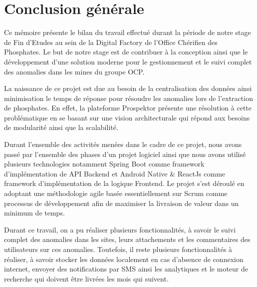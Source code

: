 \chapter*{Conclusion g\'en\'erale}

Ce m\'emoire pr\'esente le bilan du travail effectu\'e durant la p\'eriode de notre stage de Fin d'Etudes au sein de la Digital Factory de l'Office Ch\'erifien des Phosphates. Le but de notre stage est de contribuer \`a la conception ainsi que le d\'eveloppement d'une solution moderne pour le gestionnement et le suivi complet des anomalies dans les mines du groupe \gls{OCP}.

La naissance de ce projet est due au besoin de la centralisation des donn\'ees ainsi minimisation le temps de r\'eponse pour r\'esoudre les anomalies lors de l'extraction de phosphates. En effet, la plateforme Prospektor pr\'esente une r\'esolution \`a cette probl\'ematique en se basant sur une vision architecturale qui r\'epond aux besoins de modularit\'e ainsi que la scalabilit\'e.

Durant l'ensemble des activit\'es men\'ees dans le cadre de ce projet, nous avons pass\'e par l'ensemble des phases d'un projet logiciel ainsi que nous avons utilis\'e plusieurs technologies notamment Spring Boot comme framework d'impl\'ementation de \gls{API} Backend et Android Native \& ReactJs comme framework d'impl\'ementation de la logique Frontend. Le projet s'est d\'eroul\'e en adoptant une m\'ethodologie agile bas\'ee essentiellement sur Scrum comme processus de d\'eveloppement afin de maximiser la livraison de valeur dans un minimum de temps.

Durant ce travail, on a pu r\'ealiser plusieurs fonctionnalit\'es, \`a savoir le suivi complet des anomalies dans les sites, leurs attachements et les commentaires des utilisateurs sur ces anomalies. Toutefois, il reste plusieurs fonctionnalit\'es \`a r\'ealiser, \`a savoir stocker les donn\'ees localement en cas d'absence de connexion internet, envoyer  des notifications par \gls{SMS} ainsi les analytiques et le moteur de recherche qui doivent \^etre livr\'ees les mois qui suivent.